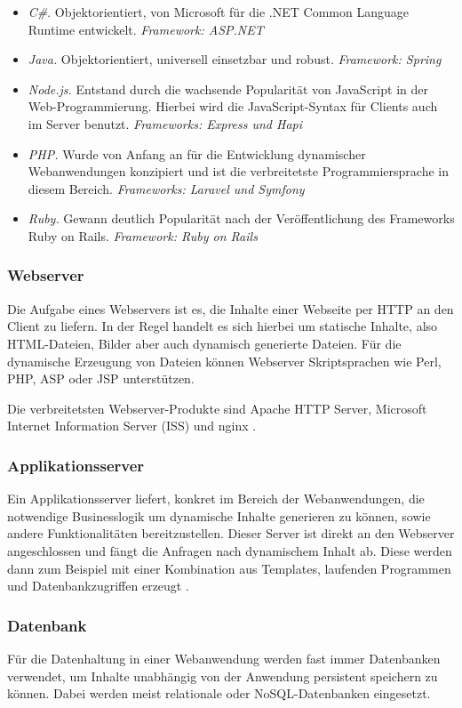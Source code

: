 \begin{itemize}
	\item \textit{C\#}. Objektorientiert, von Microsoft für die .NET Common Language Runtime entwickelt. \textit{Framework: ASP.NET}
	\item \textit{Java.} Objektorientiert, universell einsetzbar und robust. \textit{Framework: Spring}
	\item \textit{Node.js.} Entstand durch die wachsende Popularität von JavaScript in der Web-Programmierung. Hierbei wird die JavaScript-Syntax für Clients auch im Server benutzt. \textit{Frameworks: Express und Hapi}
	\item \textit{PHP.} Wurde von Anfang an für die Entwicklung dynamischer Webanwendungen konzipiert und ist die verbreitetste Programmiersprache in diesem Bereich. \textit{Frameworks: Laravel und Symfony}
	\item \textit{Ruby.} Gewann deutlich Popularität nach der Veröffentlichung des Frameworks Ruby on Rails. \textit{Framework: Ruby on Rails}
\end{itemize}

\subsubsection{Webserver}
Die Aufgabe eines Webservers ist es, die Inhalte einer Webseite per \acs{HTTP} an den Client zu liefern. In der Regel handelt es sich hierbei um statische Inhalte, also \acs{HTML}-Dateien, Bilder aber auch dynamisch generierte Dateien.
Für die dynamische Erzeugung von Dateien können Webserver Skriptsprachen wie Perl, PHP, ASP oder JSP unterstützen.

Die verbreitetsten Webserver-Produkte sind Apache \acs{HTTP} Server, Microsoft Internet Information Server (\acs{ISS}) und nginx \cite{Rouse2012}.

\subsubsection{Applikationsserver}
Ein Applikationsserver liefert, konkret im Bereich der Webanwendungen, die notwendige Businesslogik um dynamische Inhalte generieren zu können, sowie andere Funktionalitäten bereitzustellen. Dieser Server ist direkt an den Webserver angeschlossen und fängt die Anfragen nach dynamischem Inhalt ab.
Diese werden dann zum Beispiel mit einer Kombination aus Templates, laufenden Programmen und Datenbankzugriffen erzeugt \cite{ITWissen.info2013}.

\subsubsection{Datenbank}
Für die Datenhaltung in einer Webanwendung werden fast immer Datenbanken verwendet, um Inhalte unabhängig von der Anwendung persistent speichern zu können.
Dabei werden meist relationale oder \acs{NoSQL}-Datenbanken eingesetzt.

